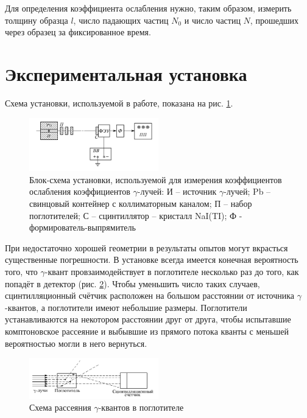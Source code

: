 \documentclass[a4paper, 12pt]{article}
\begin{document}
    	    Для определения коэффициента ослабления нужно, таким образом, измерить толщину образца $l$, число падающих частиц $N_0$ и число частиц $N$, прошедших через образец за фиксированное время.

    \section{Экспериментальная установка}

    Схема установки, используемой в работе, показана на рис. \ref{setup1}.

    \begin{figure}[h!]
        \begin{center}
            \includegraphics[width = 0.5\textwidth]{img/setup_1.png}
            \caption{Блок-схема установки, используемой для измерения коэффициентов ослабления коэффициентов $\gamma$-лучей: И -- источник $\gamma$-лучей;
                    Pb -- свинцовый контейнер с коллиматорным каналом; П -- набор поглотителей; С -- сцинтиллятор -- кристалл NaI(TI); Ф - формирователь-выпрямитель}
            \label{setup1}
        \end{center}
    \end{figure}

    При недостаточно хорошей геометрии в результаты опытов могут вкрасться существенные погрешности. В установке всегда имеется конечная вероятность того,
    что $\gamma$-квант провзаимодействует в поглотителе несколько раз до того, как попадёт в детектор (рис. \ref{setup2}).
    Чтобы уменьшить число таких случаев, сцинтилляционный счётчик  расположен на большом расстоянии от источника $\gamma$-квантов, а поглотители имеют небольшие размеры.
    Поглотители устанавливаются на некотором расстоянии друг от друга, чтобы испытавшие комптоновское рассеяние и выбывшие из прямого потока кванты с меньшей вероятностью могли в него вернуться.

    \begin{figure}[h!]
        \begin{center}
            \includegraphics[width = 0.5\textwidth]{img/setup_2.png}
            \caption{Схема рассеяния $\gamma$-квантов в поглотителе}
            \label{setup2}
        \end{center}
    \end{figure}
\end{document}
